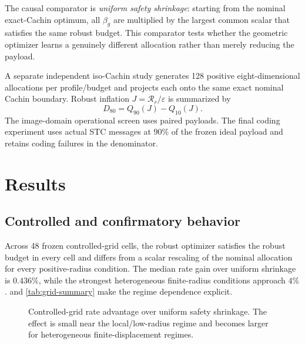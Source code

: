 \documentclass[10pt]{article}
\newcommand{\RR}{\mathcal{R}}
\begin{document}
The causal comparator is \emph{uniform safety shrinkage}: starting from the nominal exact-Cachin optimum, all \(\beta_g\) are multiplied by the largest common scalar that satisfies the same robust budget. This comparator tests whether the geometric optimizer learns a genuinely different allocation rather than merely reducing the payload.

A separate independent iso-Cachin study generates 128 positive eight-dimensional allocations per profile/budget and projects each onto the same exact nominal Cachin boundary. Robust inflation \(J=\RR_r/\varepsilon\) is summarized by
\[
D_{80}=Q_{90}(J)-Q_{10}(J).
\]
The image-domain operational screen uses paired payloads. The final coding experiment uses actual STC messages at \(90\%\) of the frozen ideal payload and retains coding failures in the denominator.

\section{Results}
\subsection{Controlled and confirmatory behavior}
Across 48 frozen controlled-grid cells, the robust optimizer satisfies the robust budget in every cell and differs from a scalar rescaling of the nominal allocation for every positive-radius condition. The median rate gain over uniform shrinkage is \(0.436\%\), while the strongest heterogeneous finite-radius conditions approach \(4\%\).  and \cref{tab:grid-summary} make the regime dependence explicit.

\begin{figure}[t]
\centering
{}
\caption{Controlled-grid rate advantage over uniform safety shrinkage. The effect is small near the local/low-radius regime and becomes larger for heterogeneous finite-displacement regimes.}
\label{fig:grid-gain}
\end{figure}
\end{document}

